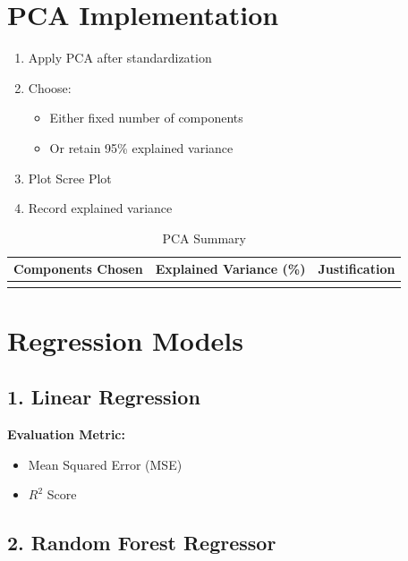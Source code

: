 \documentclass[11pt]{article}
\begin{document}
\section*{PCA Implementation}

\begin{enumerate}
    \item Apply PCA after standardization
    \item Choose:
        \begin{itemize}
            \item Either fixed number of components
            \item Or retain 95\% explained variance
        \end{itemize}
    \item Plot Scree Plot
    \item Record explained variance
\end{enumerate}

\begin{table}[h!]
\centering
\caption{PCA Summary}
\begin{tabular}{|c|c|c|}
\hline
Components Chosen & Explained Variance (\%) & Justification \\
\hline
 &  &  \\
\hline
\end{tabular}
\end{table}

\section*{Regression Models}

\subsection*{1. Linear Regression}

\textbf{Evaluation Metric:}
\begin{itemize}
    \item Mean Squared Error (MSE)
    \item $R^2$ Score
\end{itemize}

\subsection*{2. Random Forest Regressor}
\end{document}
